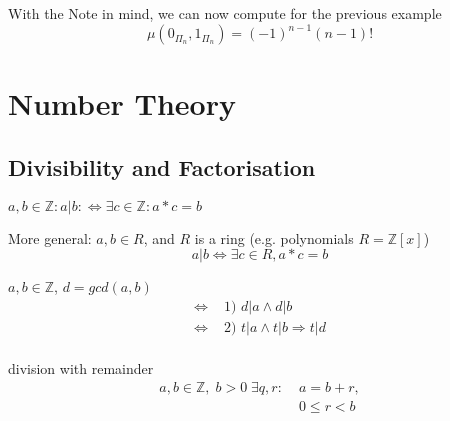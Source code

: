 With the Note in mind, we can now compute for the previous example
\[
    \mu( 0_{\Pi_n}, 1_{\Pi_n}) = (-1)^{n-1} (n-1)!
\]


\chapter{Number Theory}

\section{Divisibility and Factorisation}

\begin{definition}
$a,b \in \mathbb{Z}: a|b: \Leftrightarrow \exists c \in \mathbb{Z}: a * c = b$

More general: 
$a,b \in R$, and $R$ is a ring (e.g. polynomials $R = \mathbb{Z}[x]$)
\[
  a|b \Leftrightarrow \exists c \in R , a * c = b
\]
\end{definition}

\begin{definition}
$a,b \in \mathbb{Z}$, $d = gcd(a,b)$
\begin{align*}
    \Leftrightarrow & \text{ 1) } d|a \wedge d|b \\
    \Leftrightarrow & \text{ 2) } t|a \wedge t|b \Rightarrow t|d \\
\end{align*}
\end{definition}

\begin{definition}
division with remainder
\begin{align*}
  a,b \in \mathbb{Z}, \; 
  b > 0 \;\exists q,r: 
    & \; a = b  + r, \\ 
    & \; 0 \leq r < b
\end{align*}
\end{definition}



